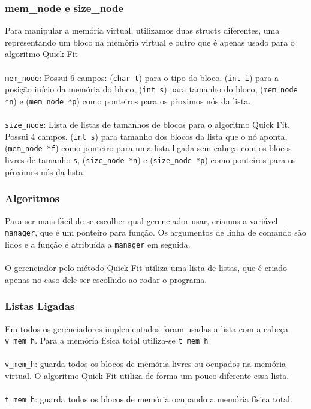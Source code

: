 \documentclass{beamer}
\begin{document}

\begin{frame}
  \frametitle{mem\_node e size\_node}
  Para manipular a memória virtual, utilizamos duas structs diferentes, uma representando um bloco na memória virtual e outro que é apenas usado para o algoritmo Quick Fit \\~\\

  \texttt{mem\_node}: Possui 6 campos: (\texttt{char t}) para o tipo do bloco, (\texttt{int i}) para a posição início da memória do bloco, (\texttt{int s}) para tamanho do bloco, (\texttt{mem\_node *n}) e (\texttt{mem\_node *p}) como ponteiros para os pŕoximos nós da lista. \\~\\

  \texttt{size\_node}: Lista de listas de tamanhos de blocos para o algoritmo Quick Fit. Possui 4 campos. (\texttt{int s}) para tamanho dos blocos da lista que o nó aponta, (\texttt{mem\_node *f}) como ponteiro para uma lista ligada sem cabeça com os blocos livres de tamanho \texttt{s}, (\texttt{size\_node *n}) e (\texttt{size\_node *p}) como ponteiros para os pŕoximos nós da lista.
\end{frame}


\begin{frame}
  \frametitle{Algoritmos}
  Para ser mais fácil de se escolher qual gerenciador usar, criamos a variável \texttt{manager}, que é um ponteiro para função. Os argumentos de linha de comando são lidos e a função é atribuída a \texttt{manager} em seguida. \\~\\

  O gerenciador pelo método Quick Fit utiliza uma lista de listas, que é criado apenas no caso dele ser escolhido ao rodar o programa.
\end{frame}


\begin{frame}
  \frametitle{Listas Ligadas}
  Em todos os gerenciadores implementados foram usadas a lista com a cabeça \texttt{v\_mem\_h}. Para a memória física total utiliza-se \texttt{t\_mem\_h} \\~\\

  \texttt{v\_mem\_h}: guarda todos os blocos de memória livres ou ocupados na memória virtual. O algoritmo Quick Fit utiliza de forma um pouco diferente essa lista. \\~\\

  \texttt{t\_mem\_h}: guarda todos os blocos de memória ocupando a memória física total.
\end{frame}
\end{document}
